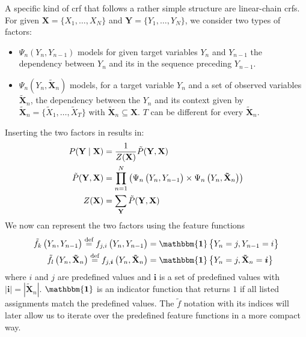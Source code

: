 A specific kind of \gls{crf} that follows a rather simple structure are \glspl{linear-chain crf}.
For given $\mathbf{X}=\{X_1,\dots,X_N\}$ and $\mathbf{Y}=\{Y_1,\dots,Y_N\}$, we consider two types of \glspl{factor}:
\begin{itemize}
  \item $\Psi_n(Y_n,Y_{n-1})$ models for given \glspl{target variable} $Y_n$ and $Y_{n-1}$ the dependency between $Y_n$ and its in the sequence preceding $Y_{n-1}$.
  \item $\Psi_n(Y_n,\mathbf{\tilde{X}}_n)$ models, for a \gls{target variable} $Y_n$ and a set of \glspl{observed variable} $\mathbf{\tilde{X}}_n$, the dependency between the $Y_n$ and its context given by $\mathbf{\tilde{X}}_n=\{\tilde{X}_1,\dots,\tilde{X}_T\}$ with $\mathbf{\tilde{X}}_n\subseteq\mathbf{X}$.
    $T$ can be different for every $\mathbf{\tilde{X}}_n$.
\end{itemize}
Inserting the two factors in  results in:
\begin{equation}
  \label{equ:linear-chain-crf-factor}
  \begin{split}
    P(\mathbf{Y}\mid\mathbf{X}) & = \frac{1}{Z(\mathbf{X})}\tilde{P}(\mathbf{Y},\mathbf{X}) \\
    \tilde{P}(\mathbf{Y},\mathbf{X}) &= \prod_{n=1}^{N}\left(\Psi_n\left(\vphantom{\tilde{X}}Y_n,Y_{n-1}\right)\times\Psi_n\left(Y_n,\mathbf{\tilde{X}}_n\right)\right) \\
    Z(\mathbf{X}) & = \sum_{\mathbf{Y}}\tilde{P}(\mathbf{Y},\mathbf{X})
  \end{split}
\end{equation}
We now can represent the two \glspl{factor} using the \glspl{feature function}
\begin{equation}
  \label{equ:linear-chain-crf-feature-functions}
  \begin{split}
    \tilde{f}_k\left(\vphantom{\tilde{X}}Y_n,Y_{n-1}\right)\equalsdef f_{j,i}\left(\vphantom{\tilde{X}}Y_n,Y_{n-1}\right) & = \mathbf{\mathbbm{1}}\left\{\vphantom{\tilde{X}}Y_n=j,Y_{n-1}=i\right\}\\
    \tilde{f}_l\left(Y_n,\mathbf{\tilde{X}}_n\right)\equalsdef f_{j,\bm{i}}\left( Y_n,\mathbf{\tilde{X}}_n\right) & = \mathbf{\mathbbm{1}}\left\{Y_n=j,\mathbf{\tilde{X}}_n=\bm{i}\right\}
  \end{split}
\end{equation}
where $i$ and $j$ are predefined values and $\bm{i}$ is a set of predefined values with $|\bm{i}|=|\mathbf{\tilde{X}}_n|$. $\mathbf{\mathbbm{1}}$ is an indicator function that returns $1$ if all listed assignments match the predefined values.
The $\tilde{f}$ notation with its indices will later allow us to iterate over the predefined \glspl{feature function} in a more compact way.

